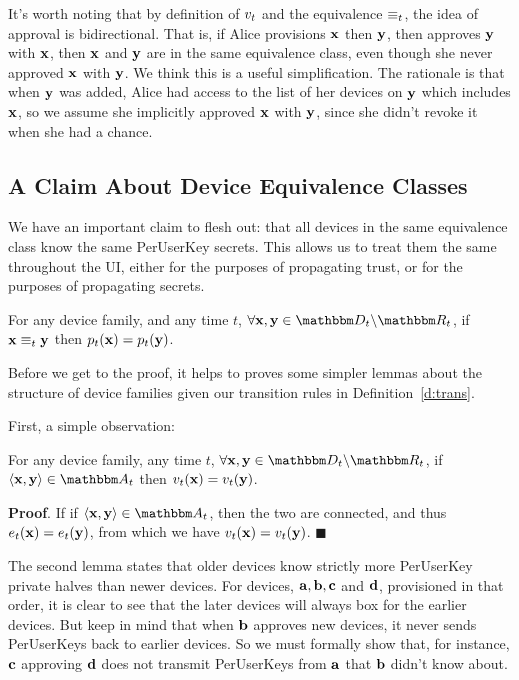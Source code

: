It’s worth noting that by definition of $v_t$ and the equivalence
$\equiv_{t}$, the idea of approval is bidirectional. That is, if Alice
provisions $\mathbf{x}$ then $\mathbf{y}$, then approves $\mathbf{y}$ with
$\mathbf{x}$, then $\mathbf{x}$ and $\mathbf{y}$ are in the same equivalence class,
even though she never approved $\mathbf{x}$ with $\mathbf{y}$. We think this is a
useful simplification. The rationale is that when $\mathbf{y}$ was added, Alice 
had access to the list of her devices on $\mathbf{y}$ which includes $\mathbf{x}$, 
so we assume she implicitly approved $\mathbf{x}$ with $\mathbf{y}$, since she 
didn't revoke it when she had a chance.

\subsection{A Claim About Device Equivalence Classes}

We have an important claim to flesh out: that all devices in the same
equivalence class know the same PerUserKey secrets. This allows us to
treat them the same throughout the UI, either for the purposes of
propagating trust, or for the purposes of propagating secrets.

\begin{theorem}
 For any device family, and any time $t$, $\forall \zdev{x}, \zdev{y} \in \zactive{t}$,
  if $\mathbf{x} \equiv_{t} \mathbf{y}$ then $p_t(\mathbf{x}) = p_t(\mathbf{y})$.
\label{thm:know_puks}
\end{theorem}

Before we get to the proof, it helps to proves some simpler lemmas about
the structure of device families given our transition rules in Definition~\ref{d:trans}.

First, a simple observation:

\begin{lemma} 
  For any device family, any time $t$, $\forall \zdev{x},\zdev{y} \in \zactive{t}$,
  if $\langle \zdev{x}, \zdev{y} \rangle \in \zset{a}_t$ then
  $v_t(\mathbf{x}) = v_t(\mathbf{y})$.
  \label{l:edge}
\end{lemma}

\textbf{Proof}. If if $\langle \zdev{x}, \zdev{y} \rangle \in \zset{a}_t$, then the two are
 connected, and thus $e_t(\mathbf{x}) = e_t(\mathbf{y})$, from which we have $v_t(\mathbf{x})
 = v_t(\mathbf{y})$. $\blacksquare$

The second lemma states that older devices know strictly more PerUserKey
private halves than newer devices. For devices, $\mathbf{a}, \mathbf{b}, \mathbf{c}$
and $\mathbf{d}$, provisioned in that order, it is clear to see that the later
devices will always box for the earlier devices. But keep in mind that 
when $\mathbf{b}$ approves new devices, it never sends PerUserKeys back to
earlier devices. So we must formally show that, for instance, $\mathbf{c}$
approving $\mathbf{d}$ does not transmit PerUserKeys from $\mathbf{a}$ 
that $\mathbf{b}$ didn't know about.


